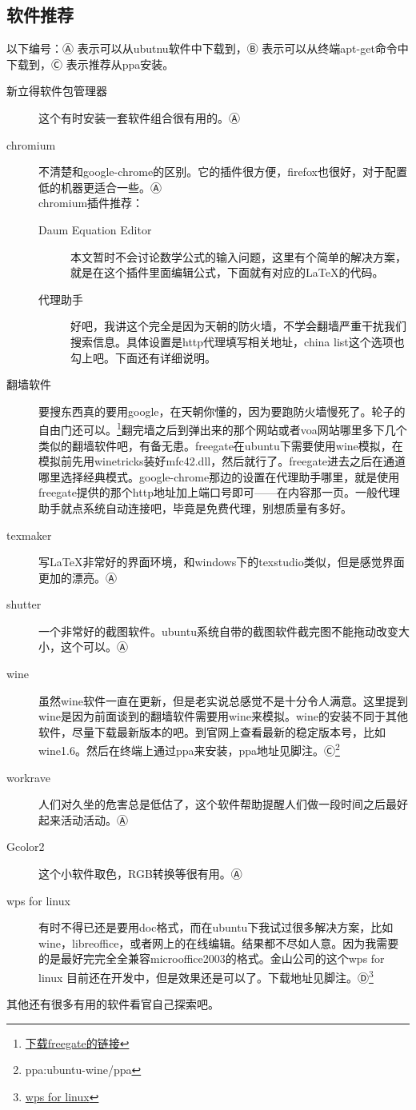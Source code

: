 \documentclass[12pt,oneside]{book}
\begin{document}
\begin{common-format}
\section{软件推荐}
以下编号：Ⓐ 表示可以从ubutnu软件中下载到，Ⓑ 表示可以从终端apt-get命令中下载到，Ⓒ 表示推荐从ppa安装。
\begin{description}
\item[新立得软件包管理器] 这个有时安装一套软件组合很有用的。Ⓐ
\item[chromium] 不清楚和google-chrome的区别。它的插件很方便，firefox也很好，对于配置低的机器更适合一些。Ⓐ\\
chromium插件推荐：
\begin{description}
\item[Daum Equation Editor]  本文暂时不会讨论数学公式的输入问题，这里有个简单的解决方案，就是在这个插件里面编辑公式，下面就有对应的\LaTeX 的代码。
\item[代理助手] 好吧，我讲这个完全是因为天朝的防火墙，不学会翻墙严重干扰我们搜索信息。具体设置是http代理填写相关地址，china list这个选项也勾上吧。下面还有详细说明。
\end{description}
\item[翻墙软件] 要搜东西真的要用google，在天朝你懂的，因为要跑防火墙慢死了。轮子的自由门还可以。\footnote{\href{http://115.com/lb/5lbdvqz2o9i}{下载freegate的链接}}翻完墙之后到弹出来的那个网站或者voa网站哪里多下几个类似的翻墙软件吧，有备无患。freegate在ubuntu下需要使用wine模拟，在模拟前先用winetricks装好mfc42.dll，然后就行了。freegate进去之后在通道哪里选择经典模式。google-chrome那边的设置在代理助手哪里，就是使用freegate提供的那个http地址加上端口号即可——在内容那一页。一般代理助手就点系统自动连接吧，毕竟是免费代理，别想质量有多好。
\item[texmaker] 写\LaTeX 非常好的界面环境，和windows下的texstudio类似，但是感觉界面更加的漂亮。Ⓐ
\item[shutter] 一个非常好的截图软件。ubuntu系统自带的截图软件截完图不能拖动改变大小，这个可以。Ⓐ
\item[wine] 虽然wine软件一直在更新，但是老实说总感觉不是十分令人满意。这里提到wine是因为前面谈到的翻墙软件需要用wine来模拟。wine的安装不同于其他软件，尽量下载最新版本的吧。到官网上查看最新的稳定版本号，比如wine1.6。然后在终端上通过ppa来安装，ppa地址见脚注。Ⓒ\footnote{ppa:ubuntu-wine/ppa}
\item[workrave] 人们对久坐的危害总是低估了，这个软件帮助提醒人们做一段时间之后最好起来活动活动。Ⓐ 
\item[Gcolor2] 这个小软件取色，RGB转换等很有用。Ⓐ
\item[wps for linux] 有时不得已还是要用doc格式，而在ubuntu下我试过很多解决方案，比如wine，libreoffice，或者网上的在线编辑。结果都不尽如人意。因为我需要的是最好完完全全兼容microoffice2003的格式。金山公司的这个wps for linux 目前还在开发中，但是效果还是可以了。下载地址见脚注。Ⓓ\footnote{\href{http://linux.wps.cn/}{wps for linux}}
\end{description} 
其他还有很多有用的软件看官自己探索吧。



\end{common-format}
\end{document}
